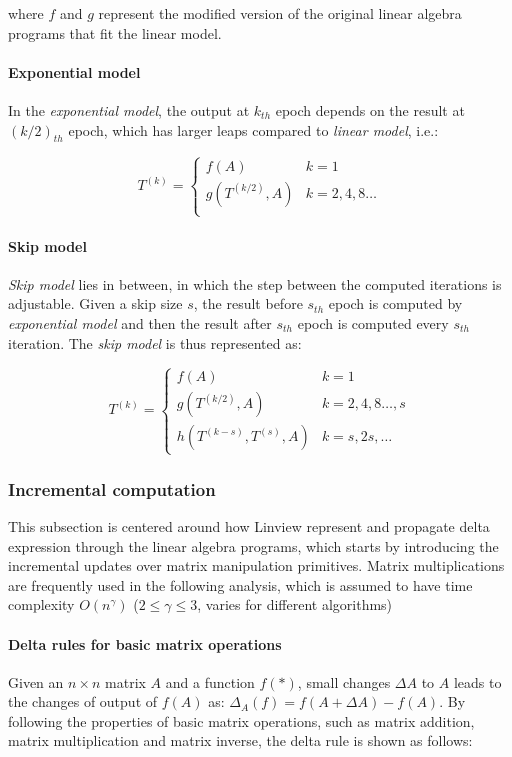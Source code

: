 where $f$ and $g$ represent the modified version of the original linear algebra programs that fit the linear model.

\paragraph{Exponential model} In the {\em exponential model}, the output at $k_{th}$ epoch depends on the result at $(k/2)_{th}$ epoch, which has larger leaps compared to {\em linear model}, i.e.:

\[
T^{(k)}=
\begin{cases}
f(A)& k=1\\
g(T^{(k/2)}, A) & k=2,4,8\dots\\
\end{cases}
\]

\paragraph{Skip model} {\em Skip model} lies in between, in which the step between the computed iterations is adjustable. Given a skip size $s$, the result before $s_{th}$ epoch is computed by {\em exponential model} and then the result after $s_{th}$ epoch is computed every $s_{th}$ iteration. The {\em skip model} is thus represented as:

\[
T^{(k)}=
\begin{cases}
f(A)& k=1\\
g(T^{(k/2)}, A) & k=2,4,8\dots,s\\
h(T^{(k-s)}, T^{(s)}, A) & k=s, 2s,\dots
\end{cases}
\]

\subsubsection{Incremental computation}
This subsection is centered around how Linview represent and propagate delta expression through the linear algebra programs, which starts by introducing the incremental updates over matrix manipulation primitives. Matrix multiplications are frequently used in the following analysis, which is assumed to have time complexity $O(n^{\gamma})$ ($2\leq \gamma \leq 3$, varies for different algorithms)

\paragraph{Delta rules for basic matrix operations}
Given an $n \times n$ matrix $A$ and a function $f(*)$, small changes $\Delta A$ to $A$ leads to the changes of output of $f(A)$ as: $\Delta_A(f) = f(A+\Delta A) - f(A)$. By following the properties of basic matrix operations, such as matrix addition, matrix multiplication and matrix inverse, the delta rule is shown as follows:

